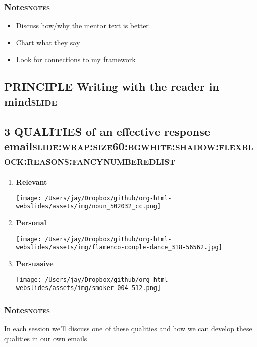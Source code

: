 \documentclass[11pt]{article}
\begin{document}
\subsubsection{Notes\hfill{}\textsc{notes}}
\label{sec:org88ee84d}
\begin{itemize}
\item Discuss how/why the mentor text is better
\item Chart what they say
\item Look for connections to my framework
\end{itemize}

\subsection{{\bfseries\sffamily PRINCIPLE} Writing with the reader in mind\hfill{}\textsc{slide}}
\label{sec:orgda6a1b7}

\subsection{\textbf{3 QUALITIES} of an effective response email\hfill{}\textsc{slide:wrap:size60:bgwhite:shadow:flexblock:reasons:fancynumberedlist}}
\label{sec:org811f26d}
\begin{enumerate}
\item \textbf{Relevant} \begin{center}
\texttt{[image: /Users/jay/Dropbox/github/org-html-webslides/assets/img/noun\_502032\_cc.png]}
\end{center}
\item \textbf{Personal} \begin{center}
\texttt{[image: /Users/jay/Dropbox/github/org-html-webslides/assets/img/flamenco-couple-dance\_318-56562.jpg]}
\end{center}
\item \textbf{Persuasive} \begin{center}
\texttt{[image: /Users/jay/Dropbox/github/org-html-webslides/assets/img/smoker-004-512.png]}
\end{center}
\end{enumerate}
\subsubsection{Notes\hfill{}\textsc{notes}}
\label{sec:orge8483a1}
In each session we'll discuss one of these qualities and how we can develop these qualities in our own emails
\end{document}
